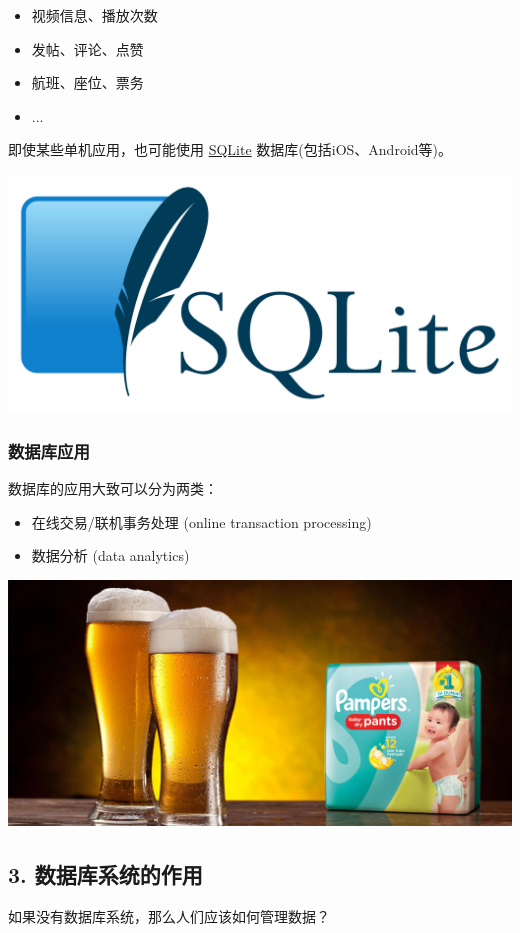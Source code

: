 \documentclass[aspectratio=169, 14pt]{beamer}
\begin{document}
\begin{frame}
	\begin{itemize}
		\item {} 视频信息、播放次数
		\item {} 发帖、评论、点赞
		\item {} 航班、座位、票务
		\item ...
	\end{itemize}
	即使某些单机应用，也可能使用 \href{https://www.sqlite.org/famous.html}{SQLite} 数据库(包括iOS、Android等)。

	\includegraphics[width=.3\paperwidth]{image/sqlite}

\end{frame}

\begin{frame}
	\frametitle{数据库应用}
	数据库的应用大致可以分为两类：
	\begin{itemize}
		\item 在线交易/联机事务处理 (online transaction processing)
		\item 数据分析 (data analytics)
	\end{itemize}
	\includegraphics[width=.5\textwidth]
	{image/beer}

\end{frame}

\begin{frame}
	\section{\textcolor{darkmidnightblue}{3. 数据库系统的作用}}
	如果没有数据库系统，那么人们应该如何管理数据？
\end{frame}
\end{document}
